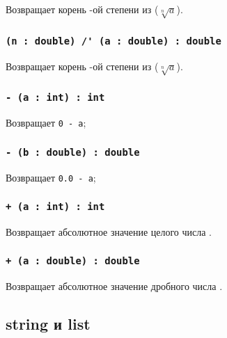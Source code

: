 Возвращает корень -ой степени из  ($\sqrt[n]{a}$).

\subsubsection{\lstinline`(n : double) /' (a : double) : double`}

Возвращает корень -ой степени из  ($\sqrt[n]{a}$).


\subsubsection{\lstinline`- (a : int) : int`}

Возвращает \lstinline|0 - a|;

\subsubsection{\lstinline`- (b : double) : double`}

Возвращает \lstinline|0.0 - a|;

\subsubsection{\lstinline`+ (a : int) : int`}

Возвращает абсолютное значение целого числа .

\subsubsection{\lstinline`+ (a : double) : double`}

Возвращает абсолютное значение дробного числа .

\subsection{{\color{lightblue}string} и {\color{lightblue}list}}

